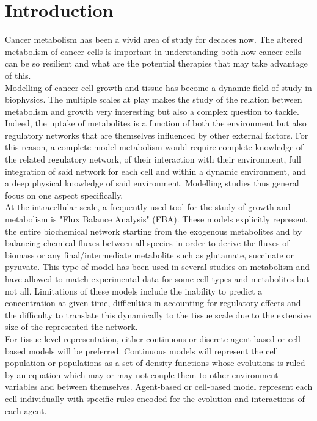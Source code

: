 \documentclass[11pt,a4paper]{article}
\begin{document}
\tableofcontents

\section{Introduction}
Cancer metabolism has been a vivid area of study for decaces now. The altered metabolism of cancer cells is important in understanding both how cancer cells can be so resilient and what are the potential therapies that may take advantage of this.\\

Modelling of cancer cell growth and tissue has become a dynamic field of study in biophysics. The multiple scales at play makes the study of the relation between metabolism and growth very interesting but also a complex question to tackle. Indeed, the uptake of metabolites is a function of both the environment but also regulatory networks that are themselves influenced by other external factors. For this reason, a complete model metabolism would require complete knowledge of the related regulatory network, of their interaction with their environment, full integration of said network for each cell and within a dynamic environment, and a deep physical knowledge of said environment. Modelling studies thus general focus on one aspect specifically.\\

At the intracellular scale, a frequently used tool for the study of growth and metabolism is "Flux Balance Analysis" (FBA). These models explicitly represent the entire biochemical network starting from the exogenous metabolites and by balancing chemical fluxes between all species in order to derive the fluxes of biomass or any final/intermediate metabolite such as glutamate, succinate or pyruvate.\cite{Orth2010} This type of model has been used in several studies on metabolism and have allowed to match experimental data for some cell types and metabolites but not all.\cite{Ng2022}\cite{Damiani2017}\cite{Shan2018} Limitations of these models include the inability to predict a concentration at given time, difficulties in accounting for regulatory effects and the difficulty to translate this dynamically to the tissue scale due to the extensive size of the represented the network.\\

For tissue level representation, either continuous or discrete agent-based or cell-based models will be preferred. Continuous models will represent the cell population or populations as a set of density functions whose evolutions is ruled by an equation which may or may not couple them to other environment variables and between themselves. Agent-based or cell-based model represent each cell individually with specific rules encoded for the evolution and interactions of each agent.\\
\end{document}
